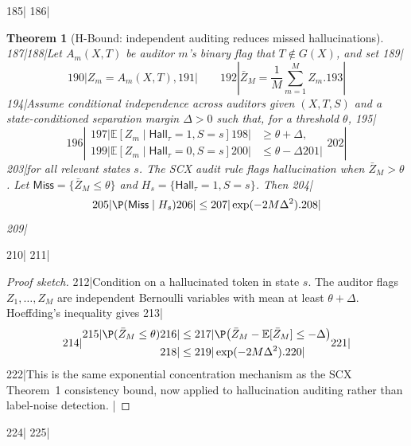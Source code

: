 \documentclass[11pt,a4paper]{article}
\newtheorem{theorem}{Theorem}[section]
\theoremstyle{definition}
\theoremstyle{remark}
\newcommand{\E}{\mathbb{E}}
\begin{document}
185|
186|\begin{theorem}[H-Bound: independent auditing reduces missed hallucinations]
187|\label{thm:h_bound}
188|Let $A_m(X,T)$ be auditor $m$'s binary flag that $T\notin G(X)$, and set
189|\[
190|Z_m=A_m(X,T),
191|\qquad
192|\bar Z_M=\frac{1}{M}\sum_{m=1}^M Z_m .
193|\]
194|Assume conditional independence across auditors given $(X,T,S)$ and a state-conditioned separation margin $\Delta>0$ such that, for a threshold $\theta$,
195|\[
196|\begin{aligned}
197|\E[Z_m\mid \mathsf{Hall}_\tau=1,S=s]
198|&\geq \theta+\Delta,\\
199|\E[Z_m\mid \mathsf{Hall}_\tau=0,S=s]
200|&\leq \theta-\Delta
201|\end{aligned}
202|\]
203|for all relevant states $s$. The SCX audit rule flags hallucination when $\bar Z_M>\theta$. Let $\mathsf{Miss}=\{\bar Z_M\leq\theta\}$ and $H_s=\{\mathsf{Hall}_\tau=1,S=s\}$. Then
204|\[
205|\P(\mathsf{Miss}\mid H_s)
206|\leq
207|\exp(-2M\Delta^2).
208|\]
209|\end{theorem}
210|
211|\begin{proof}[Proof sketch]
212|Condition on a hallucinated token in state $s$. The auditor flags $Z_1,\ldots,Z_M$ are independent Bernoulli variables with mean at least $\theta+\Delta$. Hoeffding's inequality gives
213|\[
214|\begin{aligned}
215|\P(\bar Z_M\leq \theta)
216|&\leq
217|\P\bigl(\bar Z_M-\E[\bar Z_M]\leq-\Delta\bigr)\\
218|&\leq
219|\exp(-2M\Delta^2).
220|\end{aligned}
221|\]
222|This is the same exponential concentration mechanism as the SCX Theorem~1 consistency bound, now applied to hallucination auditing rather than label-noise detection. |\end{proof}
224|
225|
\end{document}
